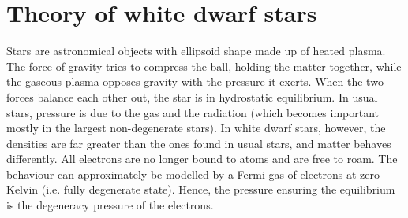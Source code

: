 \documentclass[]{article}
\begin{document}
\section{Theory of white dwarf stars}\label{sec:theroy-white-dwarfs}
	Stars are astronomical objects with ellipsoid shape made up of heated plasma. The force of gravity tries to compress the ball, holding the matter together, while the gaseous plasma opposes gravity with the pressure it exerts. When the two forces balance each other out, the star is in hydrostatic equilibrium. In usual stars, pressure is due to the gas and the radiation (which becomes important mostly in the largest non-degenerate stars). In white dwarf stars, however, the densities are far greater than the ones found in usual stars, and matter behaves differently. All electrons are no longer bound to atoms and are free to roam. The behaviour can approximately be modelled by a Fermi gas of electrons at zero Kelvin (i.e. fully degenerate state). Hence, the pressure ensuring the equilibrium is the degeneracy pressure of the electrons.
\end{document}

